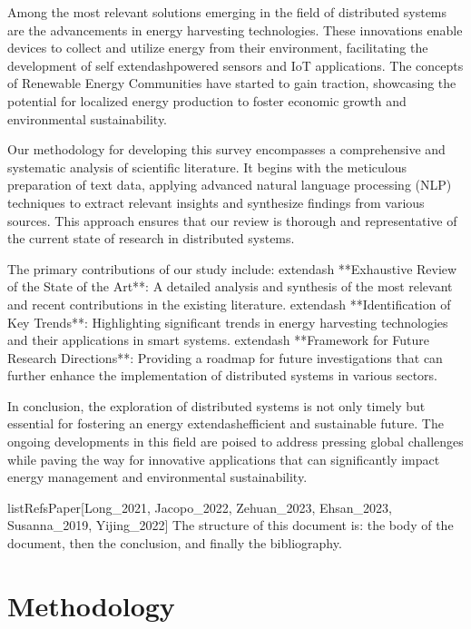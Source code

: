 \documentclass[runningheads]{llncs}
\begin{document}
Among the most relevant solutions emerging in the field of distributed systems are the advancements in energy harvesting technologies. These innovations enable devices to collect and utilize energy from their environment, facilitating the development of self	extendash{}powered sensors and IoT applications. The concepts of Renewable Energy Communities have started to gain traction, showcasing the potential for localized energy production to foster economic growth and environmental sustainability.

Our methodology for developing this survey encompasses a comprehensive and systematic analysis of scientific literature. It begins with the meticulous preparation of text data, applying advanced natural language processing (NLP) techniques to extract relevant insights and synthesize findings from various sources. This approach ensures that our review is thorough and representative of the current state of research in distributed systems.

The primary contributions of our study include:
	extendash{} **Exhaustive Review of the State of the Art**: A detailed analysis and synthesis of the most relevant and recent contributions in the existing literature.
	extendash{} **Identification of Key Trends**: Highlighting significant trends in energy harvesting technologies and their applications in smart systems.
	extendash{} **Framework for Future Research Directions**: Providing a roadmap for future investigations that can further enhance the implementation of distributed systems in various sectors.

In conclusion, the exploration of distributed systems is not only timely but essential for fostering an energy	extendash{}efficient and sustainable future. The ongoing developments in this field are poised to address pressing global challenges while paving the way for innovative applications that can significantly impact energy management and environmental sustainability.

\begin{thebibliography}{}
\end{thebibliography}

listRefsPaper[Long_2021, Jacopo_2022, Zehuan_2023, Ehsan_2023, Susanna_2019, Yijing_2022]
 The structure of this document is: the body of the document, then the conclusion, and finally the bibliography.
\section{Methodology}
\end{document}
